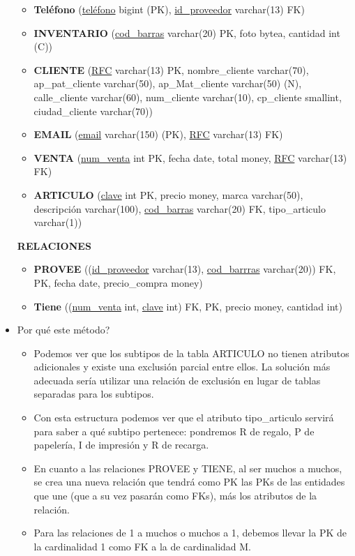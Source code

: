 \documentclass{article}
\begin{document}
\begin{itemize}
\begin{itemize}
    \item \textbf{Teléfono} (\underline{teléfono} bigint (PK), \underline{id\_proveedor} varchar(13) FK)
    
    \item \textbf{INVENTARIO} (\underline{cod\_barras} varchar(20) PK, foto bytea, cantidad int (C))
    
    \item \textbf{CLIENTE} (\underline{RFC} varchar(13) PK, nombre\_cliente varchar(70), ap\_pat\_cliente varchar(50), ap\_Mat\_cliente varchar(50) (N), calle\_cliente varchar(60), num\_cliente varchar(10), cp\_cliente smallint, ciudad\_cliente varchar(70))
    
    \item \textbf{EMAIL} (\underline{email} varchar(150) (PK), \underline{RFC} varchar(13) FK)
    
    \item \textbf{VENTA} (\underline{num\_venta} int PK, fecha date, total money, \underline{RFC} varchar(13) FK)
    
    \item \textbf{ARTICULO} (\underline{clave} int PK, precio money, marca varchar(50), descripción varchar(100), \underline{cod\_barras} varchar(20) FK, tipo\_articulo varchar(1))
\end{itemize}

\textbf{RELACIONES}

\begin{itemize}
    \item \textbf{PROVEE} ((\underline{id\_proveedor} varchar(13), \underline{cod\_barrras} varchar(20)) FK, PK, fecha date, precio\_compra money)
    
    \item \textbf{Tiene} ((\underline{num\_venta} int, \underline{clave} int) FK, PK, precio money, cantidad int)
\end{itemize}

\item Por qué este método?
\begin{itemize}
    \item Podemos ver que los subtipos de la tabla ARTICULO no tienen atributos adicionales y existe una exclusión parcial entre ellos. La solución más adecuada sería utilizar una relación de exclusión en lugar de tablas separadas para los subtipos.
    \item Con esta estructura podemos ver que el atributo tipo\_articulo servirá para saber a qué subtipo pertenece: pondremos R de regalo, P de papelería, I de impresión y R de recarga.
    \item En cuanto a las relaciones PROVEE y TIENE, al ser muchos a muchos, se crea una nueva relación que tendrá como PK las PKs de las entidades que une (que a su vez pasarán como FKs), más los atributos de la relación.
    \item Para las relaciones de 1 a muchos o muchos a 1, debemos llevar la PK de la cardinalidad 1 como FK a la de cardinalidad M.
\end{itemize}

\end{itemize}
\end{document}
